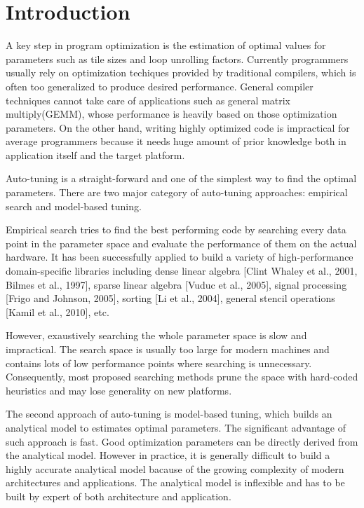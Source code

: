 \section{Introduction}
\label{sec:intro}

A key step in program optimization is the estimation of optimal values for
parameters such as tile sizes and loop unrolling factors.
Currently programmers usually rely on optimization techiques provided by traditional compilers, which
is often too generalized to produce desired performance.
General compiler techniques cannot take care of applications such as general matrix multiply(GEMM),
whose performance is heavily based on those optimization parameters.
On the other hand, writing highly optimized code is impractical for average
programmers because it needs huge amount of prior knowledge both in application
itself and the target platform.


\par

Auto-tuning is a straight-forward and one of the simplest way to find the optimal parameters.
There are two major category of auto-tuning approaches: empirical search and model-based tuning.
\par
Empirical search tries to find the best performing code by searching every data point in
the parameter space and evaluate the performance of them on the actual hardware.
It has been successfully applied to build a variety
of high-performance domain-specific libraries including
dense linear algebra [Clint Whaley et al., 2001, Bilmes et al.,
1997], sparse linear algebra [Vuduc et al., 2005], signal processing
[Frigo and Johnson, 2005], sorting [Li et al., 2004],
general stencil operations [Kamil et al., 2010], etc.
\par
However, exaustively searching the whole parameter space is slow and impractical.
The search space is usually too large for modern machines and contains lots of low performance points where
searching is unnecessary. Consequently, most proposed searching methods
prune the space with hard-coded heuristics and may lose generality on new platforms.

\par
The second approach of auto-tuning is model-based tuning, which builds an analytical model
to estimates optimal parameters. The significant advantage of such approach is fast. Good optimization
parameters can be directly derived from the analytical model.
However in practice, it is generally difficult to build a highly accurate analytical model bacause of the growing complexity
of modern architectures and applications. The analytical model is inflexible and has to be built by expert of both architecture
and application.

